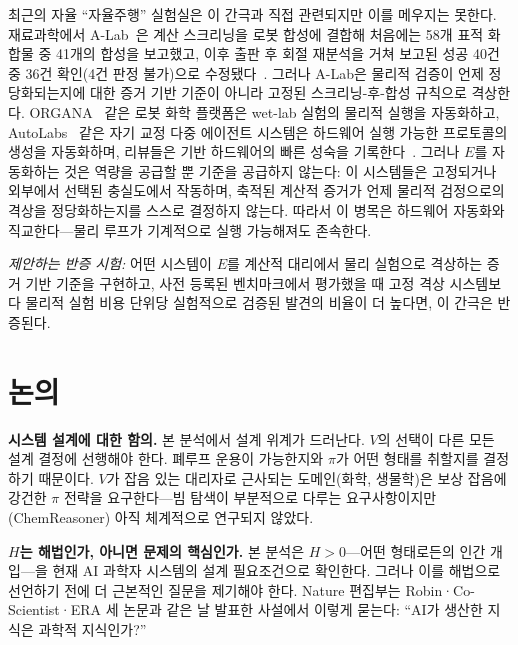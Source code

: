 \documentclass[11pt]{article}
\begin{document}
최근의 자율 ``자율주행'' 실험실은 이 간극과 직접 관련되지만 이를 메우지는 못한다. 재료과학에서 A-Lab~\citep{szymanski2023alab}은 계산 스크리닝을 로봇 합성에 결합해 처음에는 58개 표적 화합물 중 41개의 합성을 보고했고, 이후 출판 후 회절 재분석을 거쳐 보고된 성공 40건 중 36건 확인(4건 판정 불가)으로 수정됐다~\citep{szymanski2026correction}. 그러나 A-Lab은 물리적 검증이 언제 정당화되는지에 대한 증거 기반 기준이 아니라 고정된 스크리닝-후-합성 규칙으로 격상한다. ORGANA~\citep{darvish2024organa} 같은 로봇 화학 플랫폼은 wet-lab 실험의 물리적 실행을 자동화하고, AutoLabs~\citep{panapitiya2025autolabs} 같은 자기 교정 다중 에이전트 시스템은 하드웨어 실행 가능한 프로토콜의 생성을 자동화하며, 리뷰들은 기반 하드웨어의 빠른 성숙을 기록한다~\citep{tobias2025selfdriving}. 그러나 $E$를 자동화하는 것은 역량을 공급할 뿐 기준을 공급하지 않는다: 이 시스템들은 고정되거나 외부에서 선택된 충실도에서 작동하며, 축적된 계산적 증거가 언제 물리적 검정으로의 격상을 정당화하는지를 스스로 결정하지 않는다. 따라서 이 병목은 하드웨어 자동화와 직교한다---물리 루프가 기계적으로 실행 가능해져도 존속한다.

\textit{제안하는 반증 시험:} 어떤 시스템이 $E$를 계산적 대리에서 물리 실험으로 격상하는 증거 기반 기준을 구현하고, 사전 등록된 벤치마크에서 평가했을 때 고정 격상 시스템보다 물리적 실험 비용 단위당 실험적으로 검증된 발견의 비율이 더 높다면, 이 간극은 반증된다.

\section{논의}
\label{sec:discussion}

\textbf{시스템 설계에 대한 함의.} 본 분석에서 설계 위계가 드러난다. $V$의 선택이 다른 모든 설계 결정에 선행해야 한다. 폐루프 운용이 가능한지와 $\pi$가 어떤 형태를 취할지를 결정하기 때문이다. $V$가 잡음 있는 대리자로 근사되는 도메인(화학, 생물학)은 보상 잡음에 강건한 $\pi$ 전략을 요구한다---빔 탐색이 부분적으로 다루는 요구사항이지만(ChemReasoner) 아직 체계적으로 연구되지 않았다.

\textbf{$H$는 해법인가, 아니면 문제의 핵심인가.} 본 분석은 $H > 0$---어떤 형태로든의 인간 개입---을 현재 AI 과학자 시스템의 설계 필요조건으로 확인한다. 그러나 이를 해법으로 선언하기 전에 더 근본적인 질문을 제기해야 한다. Nature 편집부는 Robin·Co-Scientist·ERA 세 논문과 같은 날 발표한 사설에서 이렇게 묻는다: ``AI가 생산한 지식은 과학적 지식인가?''~\citep{nature2026editorial}
\end{document}
